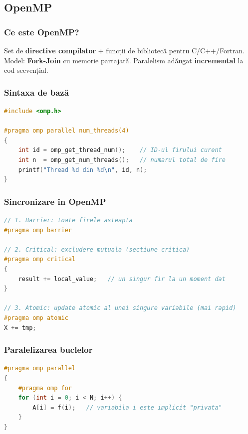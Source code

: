 \documentclass[a4paper,11pt]{article}
\begin{document}
\subsection{OpenMP}

\subsubsection{Ce este OpenMP?}
Set de \textbf{directive compilator} + funcții de bibliotecă pentru C/C++/Fortran. Model: \textbf{Fork-Join} cu memorie partajată. Paralelism adăugat \textbf{incremental} la cod secvențial.

\subsubsection{Sintaxa de bază}

\begin{lstlisting}[language=C++]
#include <omp.h>

#pragma omp parallel num_threads(4)
{
    int id = omp_get_thread_num();    // ID-ul firului curent
    int n  = omp_get_num_threads();   // numarul total de fire
    printf("Thread %d din %d\n", id, n);
}
\end{lstlisting}

\subsubsection{Sincronizare în OpenMP}

\begin{lstlisting}[language=C++]
// 1. Barrier: toate firele asteapta
#pragma omp barrier

// 2. Critical: excludere mutuala (sectiune critica)
#pragma omp critical
{
    result += local_value;   // un singur fir la un moment dat
}

// 3. Atomic: update atomic al unei singure variabile (mai rapid)
#pragma omp atomic
X += tmp;
\end{lstlisting}

\subsubsection{Paralelizarea buclelor}

\begin{lstlisting}[language=C++]
#pragma omp parallel
{
    #pragma omp for
    for (int i = 0; i < N; i++) {
        A[i] = f(i);   // variabila i este implicit "privata"
    }
}
\end{lstlisting}
\end{document}
